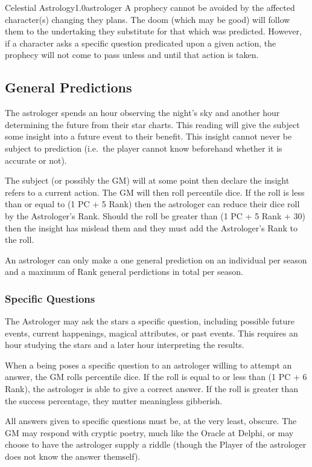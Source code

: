 \documentclass[a4paper]{article}
\begin{document}
\begin{skill}{Celestial Astrology}{1.0}{astrologer}
A prophecy cannot be avoided by the affected character(s) changing
they plans.  The doom (which may be good) will follow them to the
undertaking they substitute for that which was predicted. However, if
a character asks a specific question predicated upon a given action,
the prophecy will not come to pass unless and until that action is
taken.

\subsection{General Predictions}

The astrologer spends an hour observing the night's sky and another
hour determining the future from their star charts.  This reading will
give the subject some insight into a future event to their benefit.
This insight cannot never be subject to prediction (i.e.\ the player
cannot know beforehand whether it is accurate or not).

The subject (or possibly the GM) will at some point then declare the
insight refers to a current action.  The GM will then roll percentile
dice.  If the roll is less than or equal to (1 \x PC + 5 \x Rank) then
the astrologer can reduce their dice roll by the Astrologer's Rank.
Should the roll be greater than (1 \x PC + 5 \x Rank + 30) then the
insight has mislead them and they must add the Astrologer's Rank to
the roll.

An astrologer can only make a one general prediction on an individual
per season and a maximum of Rank general perdictions in total per
season.

\subsubsection{Specific Questions}

The Astrologer may ask the stars a specific question, including
possible future events, current happenings, magical attributes, or
past events.  This requires an hour studying the stars and a later
hour interpreting the results.

When a being poses a specific question to an astrologer willing to
attempt an answer, the GM rolls percentile dice.  If the roll is equal
to or less than (1 \x PC + 6 \x Rank), the astrologer is able to give
a correct answer. If the roll is greater than the success percentage,
they mutter meaningless gibberish.

All answers given to specific questions must be, at the very least,
obscure.  The GM may respond with cryptic poetry, much like the Oracle
at Delphi, or may choose to have the astrologer supply a riddle
(though the Player of the astrologer does not know the answer
themself).


\end{skill}
\end{document}
